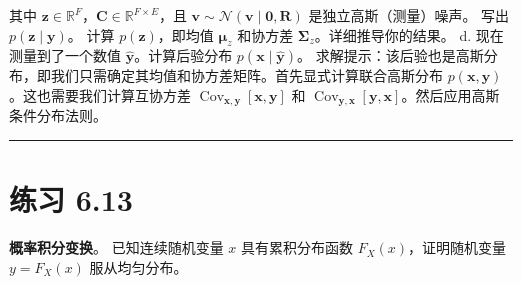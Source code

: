 其中 $ \boldsymbol{z} \in \mathbb{R}^F $，$ \boldsymbol{C} \in \mathbb{R}^{F \times E} $，且 $ \boldsymbol{v} \sim \mathcal{N}(\boldsymbol{v} \mid \boldsymbol{0}, \boldsymbol{R}) $ 是独立高斯（测量）噪声。 写出 $ p(\boldsymbol{z} \mid \boldsymbol{y}) $。 计算 $ p(\boldsymbol{z}) $，即均值 $ \boldsymbol{\mu}_z $ 和协方差 $ \boldsymbol{\Sigma}_z $。详细推导你的结果。 d. 现在测量到了一个数值 $ \hat{\boldsymbol{y}} $。计算后验分布 $ p(\boldsymbol{x} \mid \hat{\boldsymbol{y}}) $。 求解提示：该后验也是高斯分布，即我们只需确定其均值和协方差矩阵。首先显式计算联合高斯分布 $ p(\boldsymbol{x}, \boldsymbol{y}) $。这也需要我们计算互协方差 $ \operatorname{Cov}_{\boldsymbol{x}, \boldsymbol{y}}[\boldsymbol{x}, \boldsymbol{y}] $ 和 $ \operatorname{Cov}_{\boldsymbol{y}, \boldsymbol{x}}[\boldsymbol{y}, \boldsymbol{x}] $。然后应用高斯条件分布法则。

\medskip\hrule\medskip

\section*{练习 6.13}

\textbf{概率积分变换}。 已知连续随机变量 $ x $ 具有累积分布函数 $ F_X(x) $，证明随机变量 $ y = F_X(x) $ 服从均匀分布。
